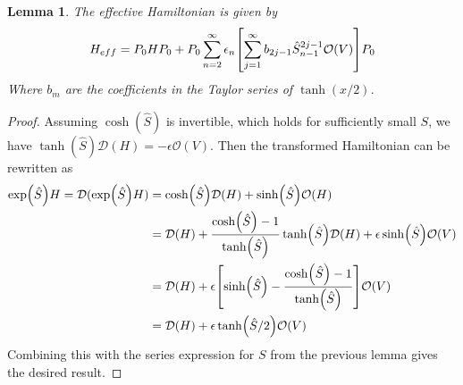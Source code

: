 \documentclass[11pt]{article}
\newtheorem{lem}{Lemma}
\begin{document}
\begin{lem}
    The effective Hamiltonian is given by 
    \begin{align}
        H_{eff} = P_0HP_0 + P_0\sum_{n=2}^\infty\epsilon_n\qty[\sum_{j = 1}^\infty b_{2j-1}\hat S^{2j-1}_{n-1}\mathcal O(V)]P_0
    \end{align}
    Where $b_m$ are the coefficients in the Taylor series of $\tanh(x/2)$. 
\end{lem}
\begin{proof}
Assuming $\cosh(\hat S)$ is invertible, which holds for sufficiently small $S$, we have $\tanh(\hat S)\mathcal D(H) = -\epsilon \mathcal O(V)$. Then the transformed Hamiltonian can be rewritten as
\begin{align}
    \exp(\hat S)H = \mathcal D(\exp(\hat S)H) &= \cosh(\hat S)\mathcal D(H) + \sinh(\hat S)\mathcal O(H) \\
                                              &= \mathcal D(H) +\frac{\cosh(\hat S)-1}{\tanh(\hat S)}\tanh(\hat S)\mathcal D(H) + \epsilon\sinh(\hat S)\mathcal O(V) \\
                                              &= \mathcal D(H) + \epsilon\qty[\sinh(\hat S) - \frac{\cosh(\hat S)-1}{\tanh(\hat S)}]\mathcal O(V)  \\
                                              &= \mathcal D(H) + \epsilon\tanh(\hat S/2)\mathcal O(V) 
\end{align}
Combining this with the series expression for $S$ from the previous lemma gives the desired result.
\end{proof}
\end{document}
